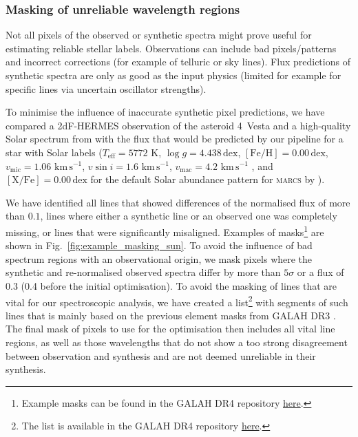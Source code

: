 \documentclass[
  journal=pasa,
  manuscript=research-paper, %
  year=2024,
  volume=37
]{cup-journal}
\newcommand{\marcs}{\textsc{marcs}\xspace}
\newcommand{\dex}{\,\mathrm{dex}}	%
\newcommand{\K}{\,\mathrm{K}}	%
\newcommand{\kms}{\,\mathrm{km\,s^{-1}}}	%
\begin{document}
\subsubsection{Masking of unreliable wavelength regions} \label{sec:masking_of_unreliable_wavelength_regions}

Not all pixels of the observed or synthetic spectra might prove useful for estimating reliable stellar labels. Observations can include bad pixels/patterns and incorrect corrections (for example of telluric or sky lines). Flux predictions of synthetic spectra are only as good as the input physics (limited for example for specific lines via uncertain oscillator strengths).

To minimise the influence of inaccurate synthetic pixel predictions, we have compared a 2dF-HERMES observation of the asteroid 4~Vesta and a high-quality Solar spectrum from \citet{Hinkle2000} with the flux that would be predicted by our pipeline for a star with Solar labels ($T_\text{eff} = 5772\,\K$, $\log g = 4.438\dex$, $\mathrm{[Fe/H]} = 0.00\dex$, $v_\text{mic} = 1.06\,\kms$, $v \sin i = 1.6\,\kms$, $v_\text{mac} = 4.2\,\kms$ \citep{Prsa2016, Jofre2017}, and $\mathrm{[X/Fe]} = 0.00\dex$ for the default Solar abundance pattern for \marcs by \citet{Grevesse2007}).

We have identified all lines that showed differences of the normalised flux of more than $0.1$, lines where either a synthetic line or an observed one was completely missing, or lines that were significantly misaligned. Examples of masks\footnote{Example masks can be found in the GALAH DR4 repository  \href{https://github.com/svenbuder/GALAH_DR4/blob/main/spectrum_analysis/spectrum_masks}{here}.} are shown in Fig.~\ref{fig:example_masking_sun}. To avoid the influence of bad spectrum regions with an observational origin, we mask pixels where the synthetic and re-normalised observed spectra differ by more than $5\sigma$ or a flux of 0.3 (0.4 before the initial optimisation). To avoid the masking of lines that are vital for our spectroscopic analysis, we have created a list\footnote{The list is available in the GALAH DR4 repository \href{https://github.com/svenbuder/GALAH_DR4/blob/main/spectrum_analysis/spectrum_masks/vital_lines.fits}{here}.}  with segments of such lines that is mainly based on the previous element masks from GALAH DR3 \citep{Buder2021}. The final mask of pixels to use for the optimisation then includes all vital line regions, as well as those wavelengths that do not show a too strong disagreement between observation and synthesis and are not deemed unreliable in their synthesis.
\end{document}
